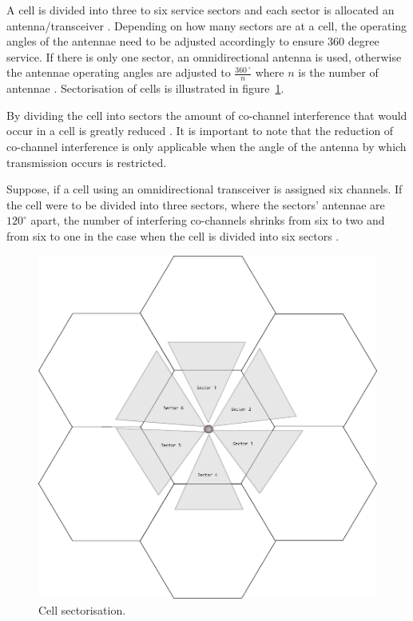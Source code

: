A cell is divided into three to six service sectors and each sector is allocated an antenna/transceiver \cite{GSMSysEngin}. Depending on how many sectors are at a cell, the operating angles of the antennae need to be adjusted accordingly to ensure 360 degree service. If there is only one sector, an omnidirectional antenna is used, otherwise the antennae operating angles are adjusted to $\frac{360\,^{\circ}}{n}$ where ${n}$ is the number of antennae \cite{Eisenblatter}. Sectorisation of cells is illustrated in figure~\ref{fig:cellsector}.

By dividing the cell into sectors the amount of co-channel interference that would occur in a cell is greatly reduced \cite{GSMArchitectureProtocolsServices}. It is important to note that the reduction of co-channel interference is only applicable when the angle of the antenna by which transmission occurs is restricted\cite{GSMArchitectureProtocolsServices}.

Suppose, if a cell using an omnidirectional transceiver is assigned six channels. If the cell were to be divided into three sectors, where the sectors' antennae are $120^\circ$ apart, the number of interfering co-channels shrinks from six to two and from six to one in the case when the cell is divided into six sectors \cite{GSMSysEngin,GSM92,GSMArchitectureProtocolsServices}.

\begin{figure}[t!]
	\begin{centering}
	\includegraphics[scale=0.75]{tikz-pics/cellsector.pdf}
	\caption[Cell Sectorization]{Cell sectorisation\cite{GSMSysEngin}.}
	\label{fig:cellsector}
	\end{centering}
\end{figure}

